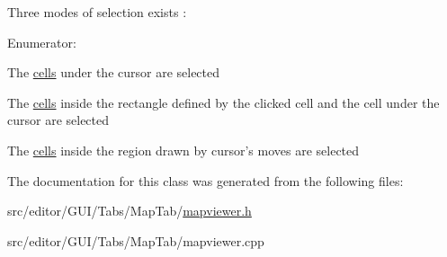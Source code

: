 \-Three modes of selection exists \-: \begin{Desc}
\item[\-Enumerator\-: ]\par
\begin{description}
\item[{\em 
\hypertarget{class_map_viewer_a8a7a365452e5770c1fab21a9bfb0067dad92f9b8968a2dac53903589a13c4c898}{\-Pencil\-Selection}\label{class_map_viewer_a8a7a365452e5770c1fab21a9bfb0067dad92f9b8968a2dac53903589a13c4c898}
}]\-The \hyperlink{class_cell}{cells} under the cursor are selected \item[{\em 
\hypertarget{class_map_viewer_a8a7a365452e5770c1fab21a9bfb0067da551f2219d9274f32ee0d787cca9a0253}{\-Rectangle\-Selection}\label{class_map_viewer_a8a7a365452e5770c1fab21a9bfb0067da551f2219d9274f32ee0d787cca9a0253}
}]\-The \hyperlink{class_cell}{cells} inside the rectangle defined by the clicked cell and the cell under the cursor are selected \item[{\em 
\hypertarget{class_map_viewer_a8a7a365452e5770c1fab21a9bfb0067da73f86e7956b7b2b6013ce0e20fa5eea0}{\-Region\-Selection}\label{class_map_viewer_a8a7a365452e5770c1fab21a9bfb0067da73f86e7956b7b2b6013ce0e20fa5eea0}
}]\-The \hyperlink{class_cell}{cells} inside the region drawn by cursor's moves are selected \end{description}
\end{Desc}



\-The documentation for this class was generated from the following files\-:\begin{DoxyCompactItemize}
\item 
src/editor/\-G\-U\-I/\-Tabs/\-Map\-Tab/\hyperlink{mapviewer_8h}{mapviewer.\-h}\item 
src/editor/\-G\-U\-I/\-Tabs/\-Map\-Tab/mapviewer.\-cpp\end{DoxyCompactItemize}
